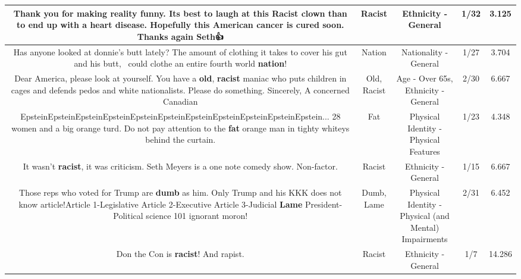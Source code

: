 \documentclass[11pt]{article}
\newlength\mylength
\begin{document}
\begin{center}
\begin{longtable}{|C{.65\mylength}|C{.30\mylength}|C{.12\mylength}|C{.12\mylength}|C{.12\mylength}|}
  \small Thank you for making reality funny. Its best to laugh at this \textbf{Racist} clown than to end up with a heart disease. Hopefully this American cancer is cured soon. Thanks again Seth👍\normalsize   & Racist & Ethnicity - General & 1/32 & 3.125 \\  \hline
  \small Has anyone looked at donnie's butt lately? The amount of clothing it takes to cover his gut and his butt,  could clothe an entire fourth world \textbf{nation}!\normalsize   & Nation & Nationality - General & 1/27 & 3.704 \\  \hline
  \small Dear America, please look at yourself. You have a \textbf{old}, \textbf{racist} maniac who puts children in cages and defends pedos and white nationalists. Please do something. Sincerely, A concerned Canadian\normalsize   & Old, Racist & Age - Over 65s, Ethnicity - General & 2/30 & 6.667 \\  \hline
  \small EpsteinEpsteinEpsteinEpsteinEpsteinEpsteinEpsteinEpsteinEpsteinEpsteinEpstein... 28 women and a big orange turd.  Do not pay attention to the \textbf{fat} orange man in tighty whiteys behind the curtain.\normalsize   & Fat & Physical Identity - Physical Features & 1/23 & 4.348 \\  \hline
  \small It wasn't \textbf{racist}, it was criticism. Seth Meyers is a one note comedy show. Non-factor.\normalsize   & Racist & Ethnicity - General & 1/15 & 6.667 \\  \hline
  \small Those reps who voted for Trump are \textbf{dumb} as him. Only Trump and his KKK  does not know article!Article 1-Legislative Article 2-Executive Article 3-Judicial \textbf{Lame} President-Political science 101 ignorant moron!\normalsize   & Dumb, Lame & Physical Identity - Physical (and Mental) Impairments & 2/31 & 6.452 \\  \hline
  \small Don the Con is \textbf{racist}! And rapist.\normalsize   & Racist & Ethnicity - General & 1/7 & 14.286 \\  \hline

\end{longtable}
\end{center}
\end{document}
